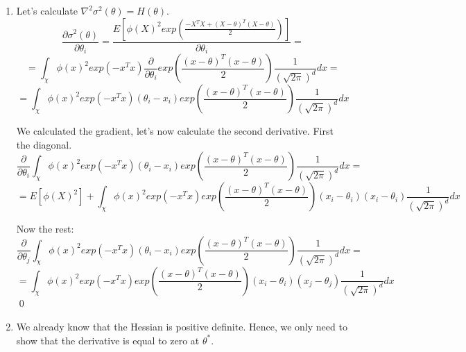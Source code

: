 \documentclass[12pt,letterpaper]{article}
\begin{document}
\begin{enumerate}[leftmargin=!,labelindent=5pt]
	Make $X + \theta = Y$, then:

	$$
	\int_{\mathbb{R}^d} \phi(y)^2 exp\left(
	 - \theta^T
	\theta - 2\theta^T (y-\theta) \right)exp(-(y-\theta)^T (y-\theta) / 2)
	\frac{1}{(\sqrt{2\pi})^d}
	dx_1...dx_d = $$

	$$ = 
	\int_{\mathbb{R}^d} \phi(y)^2 exp\left(
	\frac{1}{2}(y-\theta)^T(y-\theta) - \frac{y^Ty}{2}
	\right)
	exp \left( \frac{-y^Ty}{2}
	\right)
	\frac{1}{(\sqrt{2\pi})^d}
	dx_1...dx_d = $$
	$$ 
	= E\left[ 
	\phi^2(X) exp\left(
		\frac{-1}{2}X^T X + \frac{1}{2}(X - \theta)^T(X - \theta)
		\right)
	\right]
	$$

	Therefore, 
	$$ \sigma^2(\theta) = E\left[ 
	\phi^2(X) exp\left(
		\frac{-1}{2}X^T X + \frac{1}{2}(X - \theta)^T(X - \theta)
		\right)
	\right] - (E[\phi(X)]^2 $$ \qed



	\item Let's calculate $\nabla ^2\sigma^2(\theta) = H(\theta)$.
	$$
	\frac{\partial \sigma^2(\theta)}{\partial \theta_i} =
	\frac{E[\phi(X)^2exp(\frac{-X^T X+(X-\theta)^T(X-\theta)}{2} )]}
	{\partial \theta_i} =
	$$
	$$
	= \int_\chi \phi(x)^2 exp(-x^Tx)
	\frac{\partial}{\partial \theta_i}
	exp \left(\frac{(x-\theta)^T(x-\theta)}{2}\right)
	\frac{1}{(\sqrt{2\pi})^d}
	dx = 
	$$
	$$
	= \int_\chi \phi(x)^2 exp(-x^Tx)
	(\theta_i - x_i)
	exp \left(\frac{(x-\theta)^T(x-\theta)}{2}\right)
	\frac{1}{(\sqrt{2\pi})^d}
	dx
	$$

	We calculated the gradient, let's now calculate the second derivative.
	First the diagonal.
	$$
	\frac{\partial}{\partial \theta_i}\int_\chi \phi(x)^2 exp(-x^Tx)
	(\theta_i - x_i)
	exp \left(\frac{(x-\theta)^T(x-\theta)}{2}\right)
	\frac{1}{(\sqrt{2\pi})^d}
	dx =
	$$
	$$
	 = E[\phi(X)^2] + \int_\chi \phi(x)^2 exp(-x^T x)
	exp\left(\frac{(x - \theta)^T(x - \theta)}{2}\right)
	(x_i-\theta_i)(x_i - \theta_i)
	\frac{1}{(\sqrt{2\pi})^d}dx
	$$

	Now the rest:
	$$
	\frac{\partial}{\partial \theta_j}\int_\chi \phi(x)^2 exp(-x^Tx)
	(\theta_i - x_i)
	exp \left(\frac{(x-\theta)^T(x-\theta)}{2}\right)
	\frac{1}{(\sqrt{2\pi})^d}
	dx =
	$$
	$$
	 = \int_\chi \phi(x)^2 exp(-x^T x)
	exp\left(\frac{(x - \theta)^T(x - \theta)}{2}\right)
	(x_i-\theta_i)(x_j - \theta_j)
	\frac{1}{(\sqrt{2\pi})^d}dx
	$$
	\qed

	\item We already know that the Hessian is positive definite. Hence,
	we only need to show that the derivative is equal to zero at
	$\theta^*$.


\end{enumerate}
\end{document}
